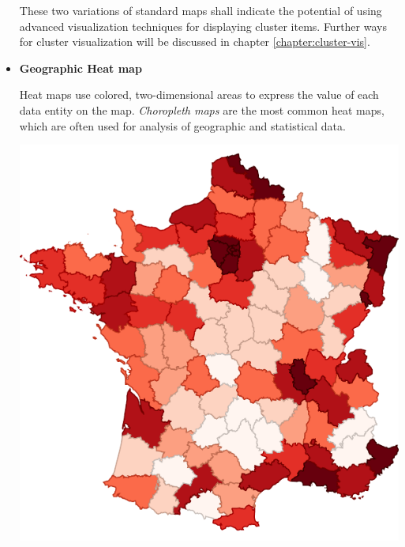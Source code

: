 \begin{itemize}
\begin{itemize}
\end {itemize}

These two variations of standard maps shall indicate the potential of using advanced visualization techniques for displaying cluster items. Further ways for cluster visualization will be discussed in chapter \ref{chapter:cluster-vis}.

\item \textbf{Geographic Heat map}

Heat maps use colored, two-dimensional areas to express the value of each data entity on the map. \textit{Choropleth maps} are the most common heat maps, which are often used for analysis of geographic and statistical data. 

\parbox [h]{0.4\textwidth}{
    \includegraphics [width=\linewidth]{figures/map_types_choropleth.pdf}
    \label{fig:map-type-choropleth}
}
\hfill
\hspace{0.5cm}
\parbox [h]{0.4\textwidth}{
}
\end{itemize}
